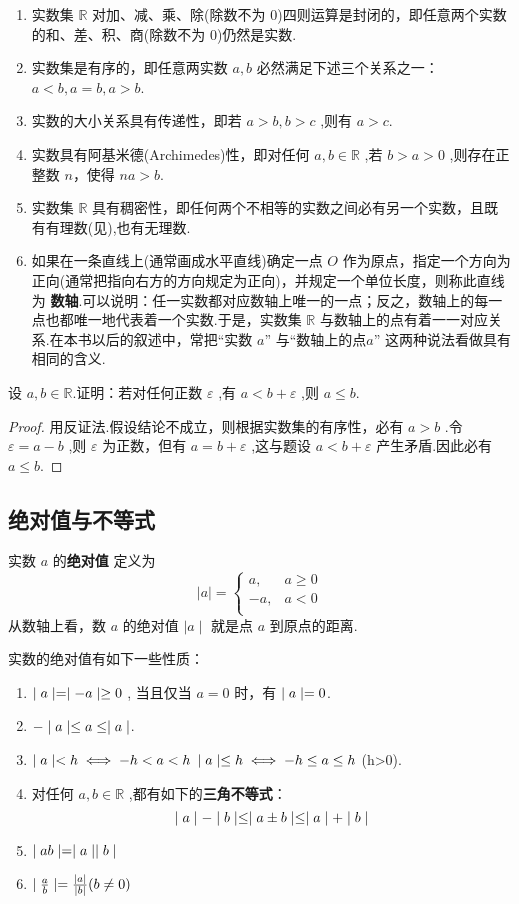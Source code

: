 \begin{enumerate}
    \item 实数集 $\mathbb{R}$ 对加、减、乘、除(除数不为 0)四则运算是封闭的，即任意两个实数的和、差、积、商(除数不为 0)仍然是实数.
    \item 实数集是有序的，即任意两实数 $a,b$ 必然满足下述三个关系之一：$a<b,a=b,a>b$.
    \item 实数的大小关系具有传递性，即若 $a>b,b>c$ ,则有 $a>c$.
    \item 实数具有阿基米德(Archimedes)性，即对任何 $a,b\in \mathbb{R}$ ,若 $b>a>0$ ,则存在正整数 $n$，使得 $na>b$.
    \item 实数集 $\mathbb{R}$ 具有稠密性，即任何两个不相等的实数之间必有另一个实数，且既有有理数(见),也有无理数.
    \item 如果在一条直线上(通常画成水平直线)确定一点 $O$ 作为原点，指定一个方向为正向(通常把指向右方的方向规定为正向)，并规定一个单位长度，则称此直线为 \textbf{数轴}.可以说明：任一实数都对应数轴上唯一的一点；反之，数轴上的每一点也都唯一地代表着一个实数.于是，实数集 $\mathbb{R}$ 与数轴上的点有着一一对应关系.在本书以后的叙述中，常把“实数 $a$” 与“数轴上的点$a$” 这两种说法看做具有相同的含义.
\end{enumerate}

\begin{example}
    设 $a,b\in \mathbb{R}$.证明：若对任何正数 $\varepsilon$ ,有 $a<b+\varepsilon$ ,则 $a \le b$.
\end{example}

\begin{proof}
    用反证法.假设结论不成立，则根据实数集的有序性，必有 $a>b$ .令 $\varepsilon=a-b$ ,则 $\varepsilon$ 为正数，但有 $a=b+\varepsilon$ ,这与题设 $a<b+\varepsilon$ 产生矛盾.因此必有 $a\le b$.
\end{proof}

\subsection{绝对值与不等式}

实数 $a$ 的\textbf{绝对值} 定义为
\[
 \mid a \mid= 
\begin{cases}
    a,&  a\ge 0 \\
    -a,& a<0 \\
\end{cases}
\]
从数轴上看，数 $a$ 的绝对值 $\mid a \mid$ 就是点 $a$ 到原点的距离.

实数的绝对值有如下一些性质：
\begin{enumerate}
    \item $\mid a \mid = \mid -a \mid \ge 0$ , 当且仅当 $a=0$ 时，有 $\mid a \mid=0$.
    \item $-\mid a \mid \le a \le \mid a \mid$.
    \item $\mid a \mid < h \iff -h < a < h$ \qquad $\mid a \mid \le h \iff -h \le a \le h$  (h>0).
    \item 对任何 $a,b \in \mathbb{R}$ ,都有如下的\textbf{三角不等式}：
    \[
    \mid a \mid - \mid b \mid \le \mid a \pm b \mid \le \mid a \mid + \mid b \mid
    \]
    \item $\mid ab \mid = \mid a \mid\mid b \mid$
    \item $ \mid \frac{a}{b} \mid= \frac{\mid a \mid}{\mid b \mid}(b\ne 0)$
\end{enumerate}

